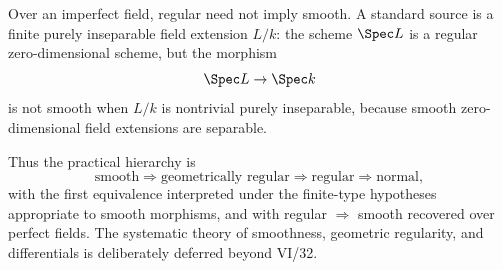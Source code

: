 \begin{solution}
Over an imperfect field, regular need not imply smooth.  A standard source is a finite purely inseparable field
extension \(L/k\): the scheme \(\Spec L\) is a regular zero-dimensional scheme, but the morphism
\[
\Spec L\to\Spec k
\]
is not smooth when \(L/k\) is nontrivial purely inseparable, because smooth zero-dimensional field extensions are
separable.

Thus the practical hierarchy is
\[
\text{smooth}
\Longrightarrow
\text{geometrically regular}
\Longrightarrow
\text{regular}
\Longrightarrow
\text{normal},
\]
with the first equivalence interpreted under the finite-type hypotheses appropriate to smooth morphisms, and with
regular \(\Rightarrow\) smooth recovered over perfect fields.  The systematic theory of smoothness, geometric
regularity, and differentials is deliberately deferred beyond VI/32.
\end{solution}
